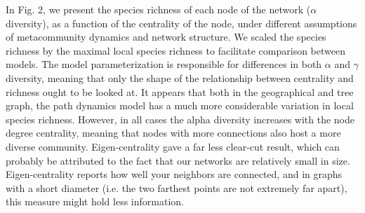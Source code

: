 \documentclass[12pt]{article}
\begin{document}
In Fig. 2, we present the species richness of each node of the network ($\alpha$
diversity), as a function of the centrality of the node, under different
assumptions of metacommunity dynamics and network structure. We scaled the
species richness by the maximal local species richness to facilitate comparison
between models. The model parameterization is responsible for differences in
both $\alpha$ and $\gamma$ diversity, meaning that only the shape of the
relationship between centrality and richness ought to be looked at.  It appears
that both in the geographical and tree graph, the path dynamics model has a
much more considerable variation in local species richness.  However, in all
cases the alpha diversity increases with the node degree centrality, meaning
that nodes with more connections also host a more diverse community.
Eigen-centrality gave a far less clear-cut result, which can probably be
attributed to the fact that our networks are relatively small in size.
Eigen-centrality reports how well your neighbors are connected, and in graphs
with a short diameter (i.e. the two farthest points are not extremely far
apart), this measure might hold less information.

\end{document}
